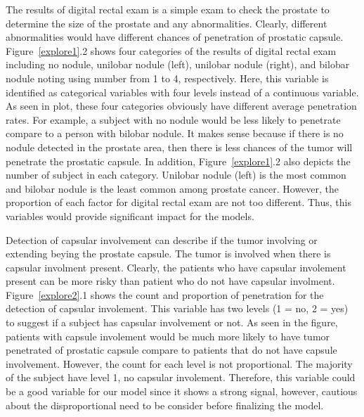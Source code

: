 \documentclass[11pt]{article}\usepackage[]{graphicx}\usepackage[]{color}
\begin{document}
\noindent The results of digital rectal exam is a simple exam to check the prostate to determine the size of the prostate and any abnormalities. Clearly, different abnormalities would have different chances of penetration of prostatic capsule. Figure~\ref{explore1}.2 shows four categories of the results of digital rectal exam including no nodule, unilobar nodule (left), unilobar nodule (right), and bilobar nodule noting using number from 1 to 4, respectively. Here, this variable is identified as categorical variables with four levels instead of a continuous variable. As seen in plot, these four categories obviously have different average penetration rates. For example, a subject with no nodule would be less likely to penetrate compare to a person with bilobar nodule. It makes sense because if there is no nodule detected in the prostate area, then there is less chances of the tumor will penetrate the prostatic capsule. In addition, Figure~\ref{explore1}.2 also depicts the number of subject in each category. Unilobar nodule (left) is the most common and bilobar nodule is the least common among prostate cancer. However, the proportion of each factor for digital rectal exam are not too different. Thus, this variables would provide significant impact for the models.   
\hfill \break

\noindent Detection of capsular involvement can describe if the tumor involving or extending beying the prostate capsule. The tumor is involved when there is capsular involment present. Clearly, the patients who have capsular involement present can be more risky than patient who do not have capsular involment. Figure~\ref{explore2}.1 shows the count and proportion of penetration for the detection of capsular involement. This variable has two levels (1 = no, 2 = yes) to suggest if a subject has capsular involvement or not. As seen in the figure, patients with capsule involement would be much more likely to have tumor penetrated of prostatic capsule compare to patients that do not have capsule involvement. However, the count for each level is not proportional. The majority of the subject have level 1, no capsular involement. Therefore, this variable could be a good variable for our model since it shows a strong signal, however, cautious about the disproportional need to be consider before finalizing the model.      
\end{document}
